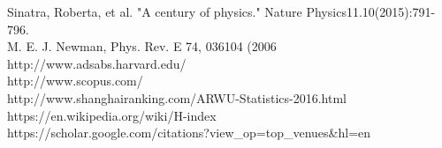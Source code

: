 \documentclass[times, 10pt,twocolumn]{article}
\begin{document}
\relax\noindent
 [1] Sinatra, Roberta, et al. "A century of physics." Nature Physics11.10(2015):791-796.\\
\relax
 [2] M. E. J. Newman, Phys. Rev. E 74, 036104 (2006\\
\relax
 [3] http://www.adsabs.harvard.edu/\\
\relax
 [4] http://www.scopus.com/\\
\relax
 [5] http://www.shanghairanking.com/ARWU-Statistics-2016.html\\
\relax
 [6] https://en.wikipedia.org/wiki/H-index\\
\relax
 [7] https://scholar.google.com/citations?view\_op=top\_venues\&hl=en\\

\nocite{ex1,ex2}


\end{document}
